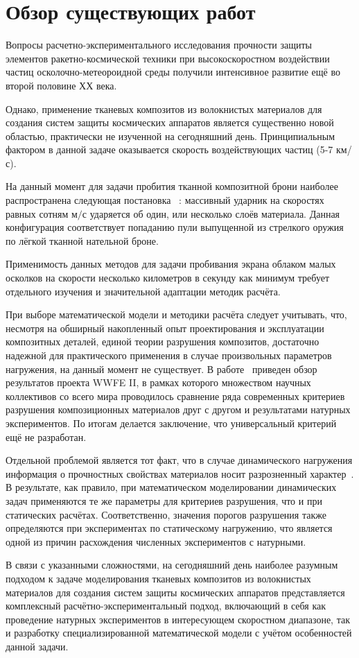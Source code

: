 \chapter{Обзор существующих работ}\label{ch:overview}

Вопросы расчетно-экспериментального исследования прочности защиты элементов ракетно-космической техники при
высокоскоростном воздействии частиц осколочно-метеороидной среды получили интенсивное развитие ещё во второй
половине ХХ века.

Однако, применение тканевых композитов из волокнистых материалов для создания систем защиты космических аппаратов
является существенно новой областью, практически не изученной на сегодняшний день.
Принципиальным фактором в данной задаче оказывается скорость воздействующих частиц (5-7 км/с).

На данный момент для задачи пробития тканной композитной брони наиболее распространена следующая постановка
~\cite{kobylkin2014,kharchenko,walker1999,walker2001,porval,bkhatnagar}:
массивный ударник на скоростях равных сотням $м/с$ ударяется об один, или несколько слоёв материала.
Данная конфигурация соответствует попаданию пули выпущенной из стрелкого оружия по лёгкой тканной нательной броне.

Применимость данных методов для задачи пробивания экрана облаком малых осколков на скорости несколько километров в
секунду как минимум  требует отдельного изучения и значительной адаптации методик расчёта.

При выборе математической модели и методики расчёта следует  учитывать, что, несмотря на обширный накопленный опыт
проектирования и  эксплуатации композитных деталей, единой теории разрушения композитов,  достаточно надежной для
практического применения в случае произвольных  параметров нагружения, на данный момент не существует.
В работе~\cite{kaddour} приведен обзор результатов проекта WWFE II, в рамках которого  множеством научных коллективов со всего
мира проводилось сравнение ряда  современных критериев разрушения композиционных материалов друг с  другом и результатами
натурных экспериментов.
По итогам делается  заключение, что универсальный критерий ещё не разработан.

Отдельной проблемой является тот факт, что в случае динамического  нагружения информация о прочностных свойствах
материалов носит разрозненный характер~\cite{kobylkin2014}.
В результате, как правило, при математическом моделировании динамических задач применяются те же параметры для
критериев разрушения, что и при статических расчётах.
Соответственно, значения порогов разрушения также определяются при экспериментах по  статическому нагружению, что
является одной из причин расхождения численных экспериментов с натурными.

В связи с указанными сложностями, на сегодняшний день наиболее разумным подходом к задаче моделирования тканевых
композитов из волокнистых материалов для создания систем защиты космических аппаратов представляется комплексный
расчётно-экспериментальный подход, включающий в себя как проведение натурных экспериментов в интересующем скоростном
диапазоне, так и разработку специализированной математической модели с учётом особенностей данной задачи.
